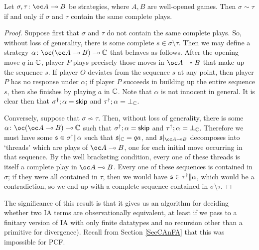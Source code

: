 \begin{proposition}
  Let $\sigma,\tau\from \oc A \implies B$ be strategies, where $A,B$ are well-opened games.  
  Then $\sigma\sim\tau$ if and only if $\sigma$ and $\tau$ contain the same complete plays.
\end{proposition}
\begin{proof}
  Suppose first that $\sigma$ and $\tau$ do not contain the same complete plays.  
  So, without loss of generality, there is some complete $s\in\sigma\setminus\tau$.
  Then we may define a strategy $\alpha \from \oc(\oc A \implies B) \implies \bC$ that behaves as follows.  
  After the opening move $q$ in $\mathbb{C}$, player $P$ plays precisely those moves in $\oc A \implies B$ that make up the sequence $s$.  
  If player $O$ deviates from the sequence $s$ at any point, then player $P$ has no response under $\alpha$; if player $P$ succeeds in building up the entire sequence $s$, then she finishes by playing $a$ in $\mathbb{C}$.  
  Note that $\alpha$ is not innocent in general.
  It is clear then that $\sigma^\dag;\alpha={\mathsf{skip}}$ and $\tau^\dag;\alpha=\bot_{\mathbb{C}}$.

  Conversely, suppose that $\sigma\not\sim\tau$.  
  Then, without loss of generality, there is some $\alpha \from \oc(\oc A\implies B) \implies \bC$ such that $\sigma^\dag;\alpha={\mathsf{skip}}$ and $\tau^\dag;\alpha=\bot_{\mathbb{C}}$.  
  Therefore we must have some $\mathfrak s\in\sigma^\dag\|\alpha$ such that $\mathfrak s\vert_{\mathbb{C}}=qa$, and $\s\vert_{\oc A \implies B}$ decomposes into `threads' which are plays of $\oc A \implies B$, one for each initial move occurring in that sequence.  
  By the well bracketing condition, every one of these threads is itself a complete play in $\oc A \implies B$.  
  Every one of these sequences is contained in $\sigma$; if they were all contained in $\tau$, then we would have $\mathfrak s\in\tau^\dag\|\alpha$, which would be a contradiction, so we end up with a complete sequence contained in $\sigma\setminus\tau$.
\end{proof}

The significance of this result is that it gives us an algorithm for deciding whether two IA terms are observationally equivalent, at least if we pass to a finitary version of IA with only finite datatypes and no recursion other than a primitive for divergence).  
Recall from Section \ref{SecCAnFA} that this was impossible for PCF.
